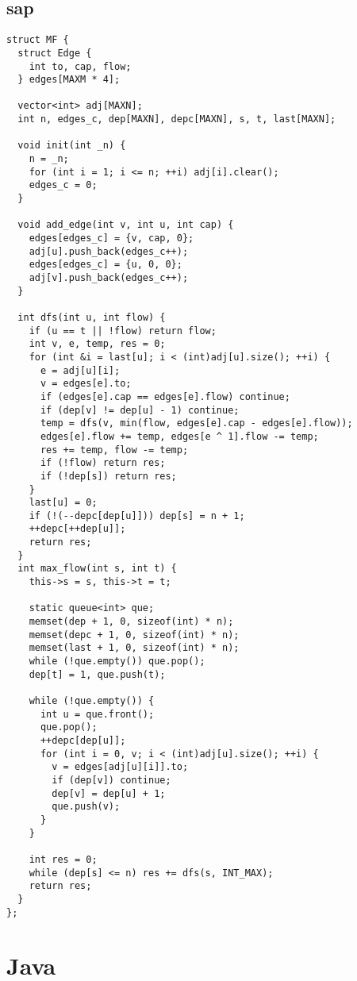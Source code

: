\documentclass[twoside]{article}
\begin{document}
\subsection{sap}
\begin{lstlisting}
struct MF {
  struct Edge {
    int to, cap, flow;
  } edges[MAXM * 4];

  vector<int> adj[MAXN];
  int n, edges_c, dep[MAXN], depc[MAXN], s, t, last[MAXN];

  void init(int _n) {
    n = _n;
    for (int i = 1; i <= n; ++i) adj[i].clear();
    edges_c = 0;
  }

  void add_edge(int v, int u, int cap) {
    edges[edges_c] = {v, cap, 0};
    adj[u].push_back(edges_c++);
    edges[edges_c] = {u, 0, 0};
    adj[v].push_back(edges_c++);
  }

  int dfs(int u, int flow) {
    if (u == t || !flow) return flow;
    int v, e, temp, res = 0;
    for (int &i = last[u]; i < (int)adj[u].size(); ++i) {
      e = adj[u][i];
      v = edges[e].to;
      if (edges[e].cap == edges[e].flow) continue;
      if (dep[v] != dep[u] - 1) continue;
      temp = dfs(v, min(flow, edges[e].cap - edges[e].flow));
      edges[e].flow += temp, edges[e ^ 1].flow -= temp;
      res += temp, flow -= temp;
      if (!flow) return res;
      if (!dep[s]) return res;
    }
    last[u] = 0;
    if (!(--depc[dep[u]])) dep[s] = n + 1;
    ++depc[++dep[u]];
    return res;
  }
  int max_flow(int s, int t) {
    this->s = s, this->t = t;

    static queue<int> que;
    memset(dep + 1, 0, sizeof(int) * n);
    memset(depc + 1, 0, sizeof(int) * n);
    memset(last + 1, 0, sizeof(int) * n);
    while (!que.empty()) que.pop();
    dep[t] = 1, que.push(t);

    while (!que.empty()) {
      int u = que.front();
      que.pop();
      ++depc[dep[u]];
      for (int i = 0, v; i < (int)adj[u].size(); ++i) {
        v = edges[adj[u][i]].to;
        if (dep[v]) continue;
        dep[v] = dep[u] + 1;
        que.push(v);
      }
    }

    int res = 0;
    while (dep[s] <= n) res += dfs(s, INT_MAX);
    return res;
  }
};

\end{lstlisting}

\section{Java}
\end{document}
